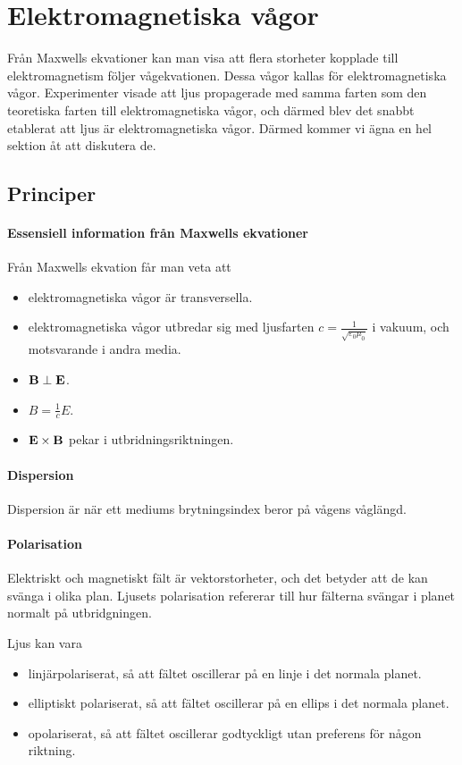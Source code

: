 \section{Elektromagnetiska vågor}
Från Maxwells ekvationer kan man visa att flera storheter kopplade till elektromagnetism följer vågekvationen. Dessa vågor kallas för elektromagnetiska vågor. Experimenter visade att ljus propagerade med samma farten som den teoretiska farten till elektromagnetiska vågor, och därmed blev det snabbt etablerat att ljus är elektromagnetiska vågor. Därmed kommer vi ägna en hel sektion åt att diskutera de.

\subsection{Principer}

\paragraph{Essensiell information från Maxwells ekvationer}
Från Maxwells ekvation får man veta att
\begin{itemize}
	\item elektromagnetiska vågor är transversella.
	\item elektromagnetiska vågor utbredar sig med ljusfarten $c = \frac{1}{\sqrt{\varepsilon_0\mu_0}}$ i vakuum, och motsvarande i andra media.
	\item $\vect{B}\perp\vect{E}$.
	\item $B = \frac{1}{c}E$.
	\item $\vect{E}\times\vect{B}$ pekar i utbridningsriktningen.
\end{itemize}

\paragraph{Dispersion}
Dispersion är när ett mediums brytningsindex beror på vågens våglängd.

\paragraph{Polarisation}
Elektriskt och magnetiskt fält är vektorstorheter, och det betyder att de kan svänga i olika plan. Ljusets polarisation refererar till hur fälterna svängar i planet normalt på utbridgningen.

Ljus kan vara
\begin{itemize}
	\item linjärpolariserat, så att fältet oscillerar på en linje i det normala planet.
	\item elliptiskt polariserat, så att fältet oscillerar på en ellips i det normala planet.
	\item opolariserat, så att fältet oscillerar godtyckligt utan preferens för någon riktning.
\end{itemize}

